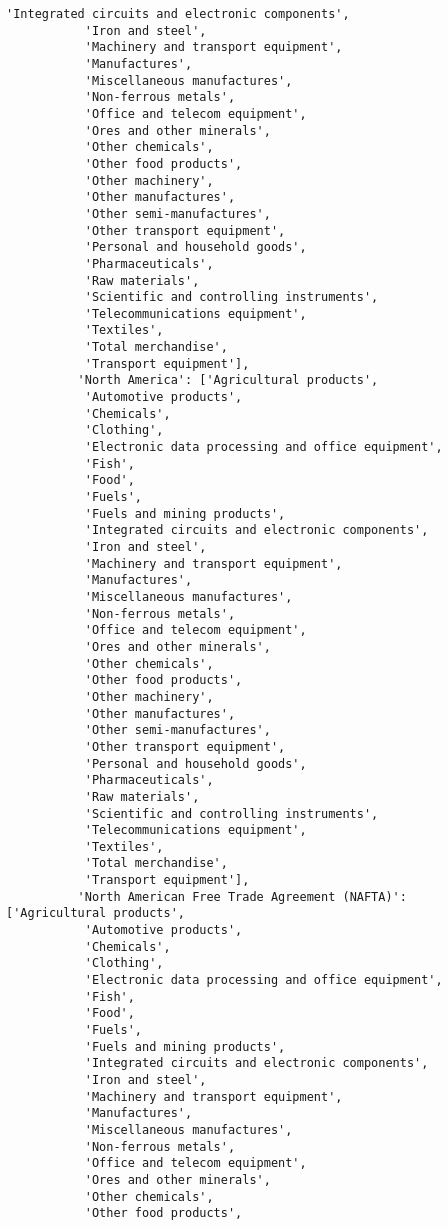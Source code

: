 \documentclass[11pt]{article}
\begin{document}
\begin{Verbatim}[commandchars=\\\{\}]
           'Integrated circuits and electronic components',
           'Iron and steel',
           'Machinery and transport equipment',
           'Manufactures',
           'Miscellaneous manufactures',
           'Non-ferrous metals',
           'Office and telecom equipment',
           'Ores and other minerals',
           'Other chemicals',
           'Other food products',
           'Other machinery',
           'Other manufactures',
           'Other semi-manufactures',
           'Other transport equipment',
           'Personal and household goods',
           'Pharmaceuticals',
           'Raw materials',
           'Scientific and controlling instruments',
           'Telecommunications equipment',
           'Textiles',
           'Total merchandise',
           'Transport equipment'],
          'North America': ['Agricultural products',
           'Automotive products',
           'Chemicals',
           'Clothing',
           'Electronic data processing and office equipment',
           'Fish',
           'Food',
           'Fuels',
           'Fuels and mining products',
           'Integrated circuits and electronic components',
           'Iron and steel',
           'Machinery and transport equipment',
           'Manufactures',
           'Miscellaneous manufactures',
           'Non-ferrous metals',
           'Office and telecom equipment',
           'Ores and other minerals',
           'Other chemicals',
           'Other food products',
           'Other machinery',
           'Other manufactures',
           'Other semi-manufactures',
           'Other transport equipment',
           'Personal and household goods',
           'Pharmaceuticals',
           'Raw materials',
           'Scientific and controlling instruments',
           'Telecommunications equipment',
           'Textiles',
           'Total merchandise',
           'Transport equipment'],
          'North American Free Trade Agreement (NAFTA)': ['Agricultural products',
           'Automotive products',
           'Chemicals',
           'Clothing',
           'Electronic data processing and office equipment',
           'Fish',
           'Food',
           'Fuels',
           'Fuels and mining products',
           'Integrated circuits and electronic components',
           'Iron and steel',
           'Machinery and transport equipment',
           'Manufactures',
           'Miscellaneous manufactures',
           'Non-ferrous metals',
           'Office and telecom equipment',
           'Ores and other minerals',
           'Other chemicals',
           'Other food products',

\end{Verbatim}
\end{document}
